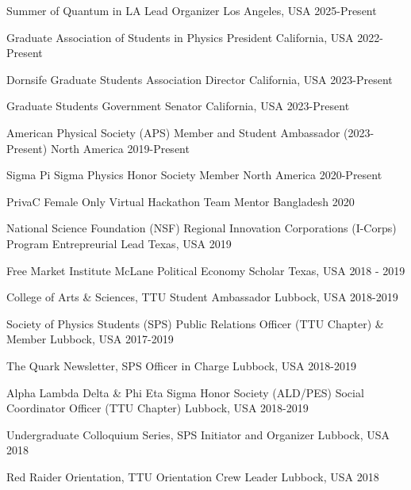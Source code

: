 
\begin{cventries}

    \cventry
    {Summer of Quantum in LA}
    {Lead Organizer}
    {Los Angeles, USA}
    {2025-Present}
    {}

    \cventry
    {Graduate Association of Students in Physics}
    {President}
    {California, USA}
    {2022-Present}
    {}

    \cventry
    {Dornsife Graduate Students Association}
    {Director}
    {California, USA}
    {2023-Present}
    {}

    \cventry
    {Graduate Students Government}
    {Senator}
    {California, USA}
    {2023-Present}
    {}

    \cventry
    {American Physical Society (APS)}
    {Member and Student Ambassador (2023-Present)}
    {North America}
    {2019-Present}
    {}

    \cventry
    {Sigma Pi Sigma Physics Honor Society}
    {Member}
    {North America}
    {2020-Present}
    {}

    \cventry
    {PrivaC Female Only Virtual Hackathon}
    {Team Mentor}
    {Bangladesh}
    {2020}
    {}



    \cventry
    {National Science Foundation (NSF) Regional Innovation Corporations (I-Corps) Program}
    {Entrepreurial Lead}
    {Texas, USA}
    {2019}
    {}

    \cventry
    {Free Market Institute}
    {McLane Political Economy Scholar}
    {Texas, USA}
    {2018 - 2019}
    {}

    \cventry
    {College of Arts \& Sciences, TTU}
    {Student Ambassador}
    {Lubbock, USA}
    {2018-2019}
    {}

    \cventry
    {Society of Physics Students (SPS)}
    {Public Relations Officer (TTU Chapter) \& Member}
    {Lubbock, USA}
    {2017-2019}
    {}

    \cventry
    {The Quark Newsletter, SPS}
    {Officer in Charge}
    {Lubbock, USA}
    {2018-2019}
    {}

    \cventry
    {Alpha Lambda Delta \& Phi Eta Sigma Honor Society (ALD/PES)}
    {Social Coordinator Officer (TTU Chapter)}
    {Lubbock, USA}
    {2018-2019}
    {}

    \cventry
    {Undergraduate Colloquium Series, SPS}
    {Initiator and Organizer}
    {Lubbock, USA}
    {2018}
    {}


    \cventry
    {Red Raider Orientation, TTU}
    {Orientation Crew Leader}
    {Lubbock, USA}
    {2018}
    {}



\end{cventries}

